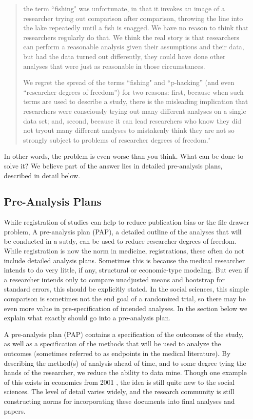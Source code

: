 \documentclass[12pt] {article}
\begin{document}
\begin{quote}
the term ``fishing" was unfortunate, in that it invokes an image of a
researcher trying out comparison after comparison, throwing the line
into the lake repeatedly until a fish is snagged. We have no reason to
think that researchers regularly do that. We think the real story is
that researchers can perform a reasonable analysis given their
assumptions and their data, but had the data turned out differently,
they could have done other analyses that were just as reasonable in
those circumstances.

We regret the spread of the terms ``fishing" and ``p-hacking'' (and even
``researcher degrees of freedom'') for two reasons: first, because when
such terms are used to describe a study, there is the misleading
implication that researchers were consciously trying out many different
analyses on a single data set; and, second, because it can lead
researchers who know they did not tryout many different analyses to
mistakenly think they are not so strongly subject to problems of
researcher degrees of freedom."
\end{quote}

In other words, the problem is even worse than you think. What can be
done to solve it? We believe part of the answer lies in detailed
pre-analysis plans, described in detail below.

\subsection{Pre-Analysis
Plans}\label{pre-analysis-plans}

While registration of studies can help to reduce publication bias or the file drawer problem, 
A pre-analysis plan (PAP), a detailed outline of the analyses that will be conducted in a sutdy, can be used to reduce researcher degrees of freedom. While registration is now the norm in medicine,
registrations, these often do not include
detailed analysis plans. Sometimes
this is because the medical researcher intends to do very little, if
any, structural or economic-type modeling. But even if a researcher
intends only to compare unadjusted means and bootstrap for standard
errors, this should be explicitly stated. In the social sciences, this
simple comparison is sometimes not the end goal of a randomized trial,
so there may be even more value in pre-specification of intended analyses.
In the section below we explain what exactly should go into a pre-analysis plan.

A pre-analysis plan (PAP) contains a specification of the outcomes of the study, as well as a specification
of the methods that will be used to analyze the outcomes (sometimes
referred to as endpoints in the medical literature). By describing the
method(s) of analysis ahead of time, and to some degree tying the hands
of the researcher, we reduce the ability to data mine. Though one
example of this exists in economics from 2001 \citep{neumark_employment_2001}, the idea
is still quite new to the social sciences. The level of detail varies
widely, and the research community is still constructing norms for
incorporating these documents into final analyses and papers.
\end{document}
